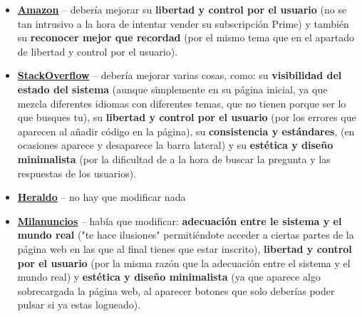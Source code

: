 \documentclass[openany,overnay,a4paper, twoside, 14pt]{book}
\begin{document}
\begin{itemize}
    \item \textbf{\underline{Amazon}} -- debería mejorar su \textbf{libertad y control por el usuario} (no se tan intrusivo a la hora de intentar vender su subscripción Prime) y también su \textbf{reconocer mejor que recordad} (por el mismo tema que en el apartado de libertad y control por el usuario).
    \item \textbf{\underline{StackOverflow}} -- debería mejorar varias cosas, como: su \textbf{visibilidad del estado del sistema} (aunque simplemente en su página inicial, ya que mezcla diferentes idiomas con diferentes temas, que no tienen porque ser lo que busques tu), su \textbf{libertad y control por el usuario} (por los errores que aparecen al añadir código en la página), su \textbf{consistencia y estándares}, (en ocasiones aparece y desaparece la barra lateral) y su \textbf{estética y diseño minimalista} (por la dificultad de a la hora de buscar la pregunta y las respuestas de los usuarios).
    \item \textbf{\underline{Heraldo}} -- no hay que modificar nada
    \item \textbf{\underline{Milanuncios}} -- había que modificar: \textbf{adecuación entre le sistema y el mundo real }("te hace ilusiones" permitiéndote acceder a ciertas partes de la página web en las que al final tienes que estar inscrito), \textbf{libertad y control por el usuario }(por la misma razón que la adecuación entre el sistema y el mundo real) y \textbf{estética y diseño minimalista} (ya que aparece algo sobrecargada la página web, al aparecer botones que solo deberías poder pulsar si ya estas logueado).
\end{itemize}
\end{document}
